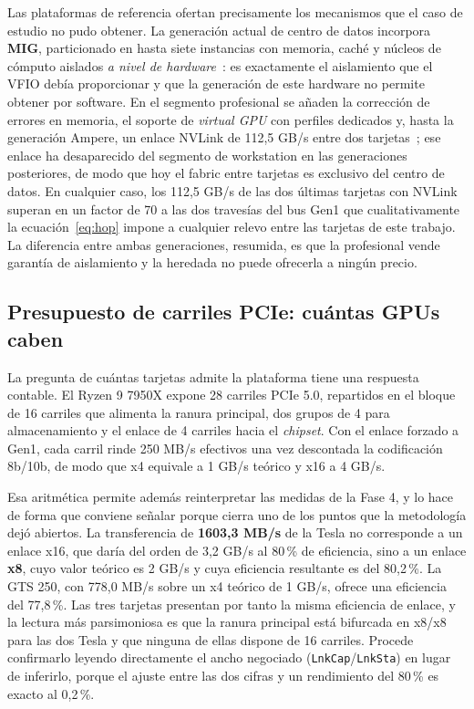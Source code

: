 \documentclass[a4paper,11pt]{article}
\begin{document}
Las plataformas de referencia ofertan precisamente los mecanismos que el caso de estudio no pudo obtener. La generación actual de
centro de datos incorpora \textbf{MIG}, particionado en hasta siete instancias con memoria, caché y núcleos de cómputo aislados
\emph{a nivel de hardware}~\cite{nvidiablackwellultra}: es exactamente el aislamiento que el VFIO debía proporcionar y que la
generación de este hardware no permite obtener por software. En el segmento profesional se añaden la corrección de errores en
memoria, el soporte de \textit{virtual GPU} con perfiles dedicados y, hasta la generación Ampere, un enlace NVLink de 112,5 GB/s
entre dos tarjetas~\cite{nvidiaa6000}; ese enlace ha desaparecido del segmento de workstation en las generaciones posteriores, de
modo que hoy el fabric entre tarjetas es exclusivo del centro de datos. En cualquier caso, los 112,5 GB/s de las dos últimas
tarjetas con NVLink superan en un factor de 70 a las dos travesías del bus Gen1 que cualitativamente la ecuación~\eqref{eq:hop}
impone a cualquier relevo entre las tarjetas de este trabajo. La diferencia entre ambas generaciones, resumida, es que la
profesional vende garantía de aislamiento y la heredada no puede ofrecerla a ningún precio.

\subsection*{Presupuesto de carriles PCIe: cuántas GPUs caben}

La pregunta de cuántas tarjetas admite la plataforma tiene una respuesta contable. El Ryzen 9 7950X expone 28 carriles PCIe 5.0,
repartidos en el bloque de 16 carriles que alimenta la ranura principal, dos grupos de 4 para almacenamiento y el enlace de 4
carriles hacia el \textit{chipset}. Con el enlace forzado a Gen1, cada carril rinde 250 MB/s efectivos una vez descontada la
codificación 8b/10b, de modo que x4 equivale a 1 GB/s teórico y x16 a 4 GB/s.

Esa aritmética permite además reinterpretar las medidas de la Fase 4, y lo hace de forma que conviene señalar porque cierra uno de
los puntos que la metodología dejó abiertos. La transferencia de \textbf{1603,3 MB/s} de la Tesla no corresponde a un enlace x16,
que daría del orden de 3,2 GB/s al 80\,\% de eficiencia, sino a un enlace \textbf{x8}, cuyo valor teórico es 2 GB/s y cuya
eficiencia resultante es del 80,2\,\%. La GTS 250, con 778,0 MB/s sobre un x4 teórico de 1 GB/s, ofrece una eficiencia del
77,8\,\%. Las tres tarjetas presentan por tanto la misma eficiencia de enlace, y la lectura más parsimoniosa es que la ranura
principal está bifurcada en x8/x8 para las dos Tesla y que ninguna de ellas dispone de 16 carriles. Procede confirmarlo leyendo
directamente el ancho negociado (\texttt{LnkCap}/\texttt{LnkSta}) en lugar de inferirlo, porque el ajuste entre las dos cifras y
un rendimiento del 80\,\% es exacto al 0,2\,\%.
\end{document}
